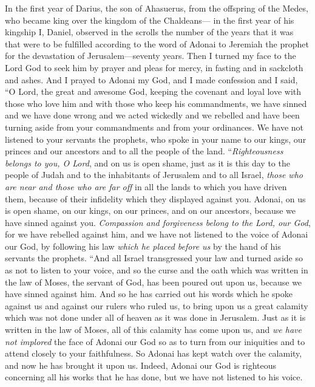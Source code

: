 \begin{biblechapter} %
 In the first year of Darius, the son of Ahasuerus, from the offspring of the Medes, who became king over the kingdom of the Chaldeans—
\verse in the first year of his kingship I, Daniel, observed in the scrolls the number of the years that it was that were to be fulfilled according to the word of Adonai to Jeremiah the prophet for the devastation of Jerusalem—seventy years.
\verse Then I turned my face to the Lord God to seek him by prayer and pleas for mercy, in fasting and in sackcloth and ashes.
\verse And I prayed to Adonai my God, and I made confession and I said, “O Lord, the great and awesome God, keeping the covenant and loyal love with those who love him and with those who keep his commandments,
\verse we have sinned and we have done wrong and we acted wickedly and we rebelled and have been turning aside from your commandments and from your ordinances.
\verse We have not listened to your servants the prophets, who spoke in your name to our kings, our princes and our ancestors and to all the people of the land.
\verse “\textit{Righteousness belongs to you, O Lord}, and on us is open shame, just as it is this day to the people of Judah and to the inhabitants of Jerusalem and to all Israel, \textit{those who are near and those who are far off} in all the lands to which you have driven them, because of their infidelity which they displayed against you.
\verse Adonai, on us is open shame, on our kings, on our princes, and on our ancestors, because we have sinned against you.
\verse \textit{Compassion and forgiveness belong to the Lord, our God}, for we have rebelled against him,
\verse and we have not listened to the voice of Adonai our God, by following his law \textit{which he placed before us} by the hand of his servants the prophets.
\verse “And all Israel transgressed your law and turned aside so as not to listen to your voice, and so the curse and the oath which was written in the law of Moses, the servant of God, has been poured out upon us, because we have sinned against him.
\verse And so he has carried out his words which he spoke against us and against our rulers who ruled us, to bring upon us a great calamity which was not done under all of heaven as it was done in Jerusalem.
\verse Just as it is written in the law of Moses, all of this calamity has come upon us, and \textit{we have not implored} the face of Adonai our God so as to turn from our iniquities and to attend closely to your faithfulness.
\verse So Adonai has kept watch over the calamity, and now he has brought it upon us. Indeed, Adonai our God is righteous concerning all his works that he has done, but we have not listened to his voice.

\end{biblechapter}
